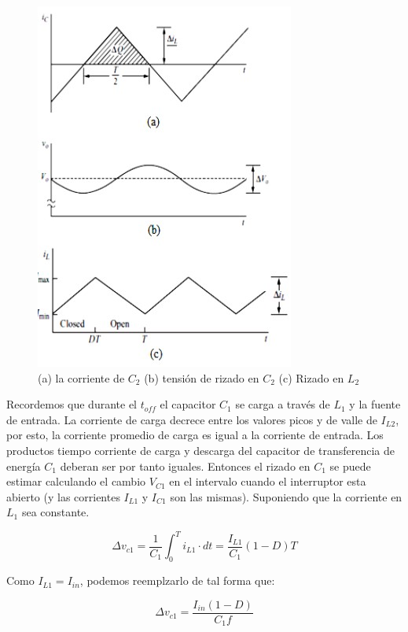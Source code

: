 \documentclass[conference]{IEEEtran}
\begin{document}
\begin{figure}[h!]
    \centering
    \includegraphics[scale=0.8]{imagenes/robodelsiglo.jpg}
    \caption{(a) la corriente de $C_2$ (b) tensión de rizado en $C_2$ (c) Rizado en $L_2$}
    \label{fig: robo}
\end{figure}

Recordemos que durante el $t_{off}$ el capacitor $C_1$ se carga a través de $L_1$ y la fuente de entrada. La corriente de carga decrece entre los valores picos y de valle de $I_{L2}$, por esto, la corriente promedio de carga es igual a la corriente de entrada. Los productos tiempo corriente de carga y descarga del capacitor de transferencia de energía $C_1$ deberan ser por tanto iguales. Entonces el rizado en $C_1$ se puede estimar calculando el cambio $V_{C1}$ en el intervalo cuando el interruptor esta abierto (y las corrientes $I_{L1}$ y $I_{C1}$ son las mismas). Suponiendo que la corriente en $L_1$ sea constante.

\begin{equation}
    \Delta v_{c1}= \frac{1}{C_1} \int_{0}^{T} i_{L1} \cdot dt=\frac{I_{L1}}{C_1}(1-D)T
\end{equation}

Como $I_{L1}=I_{in}$, podemos reemplzarlo de tal forma que:

\begin{equation}
     \Delta v_{c1}=\frac{I_{in}(1-D)}{C_1f}
\end{equation}
\end{document}
